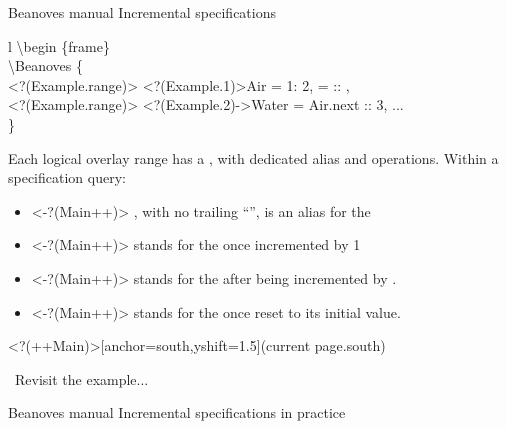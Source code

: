 \documentclass{beamer}
\begin{document}
\begin{frame}
{Beanoves manual}
{\large Incremental specifications}
\begin{myCodeBox}{l}%
\backslash begin \{frame\}\\
\backslash Beanoves \{\\
\phantom{xx}%
\alt<?(Example.range)>{%
  {\only<?(Example.1)>{\color{MyGreen}}Air \phantom{xx}= 1\phantom{xxxxxxxx}: 2,}
}{%
   =  :: ,
}\\
\alt<?(Example.range)>{%
\phantom{xx}%
{\only<?(Example.2)->{\color{MyGreen}}Water = Air.next :: 3,}
}{%
\phantom{xx}...
}\\
\}
\end{myCodeBox}
Each logical overlay range has a , with dedicated alias and operations.
Within a specification query:
\begin{itemize}
\item
\only<-?(Main++)>{}%
, with no trailing ``'', is an alias for the 
\item
\only<-?(Main++)>{}%
 stands for the  once incremented by 1
\item
\only<-?(Main++)>{}%
 stands for the  after being incremented by .
\item
\only<-?(Main++)>{}%
 stands for the  once reset to its initial value.
\end{itemize}
%
\Sticky<?(++Main)>[anchor=south,yshift=1.5\baselineskip](current page.south){\bfseries%
\begin{minipage}{0.5\textwidth}
\myWatch\ Revisit the example...
\end{minipage}
}%
\vspace{2\baselineskip}
%
\end{frame}
\begin{frame}
{Beanoves manual}
{\large Incremental specifications in practice}
\useMyPractice
\end{frame}
\end{document}
